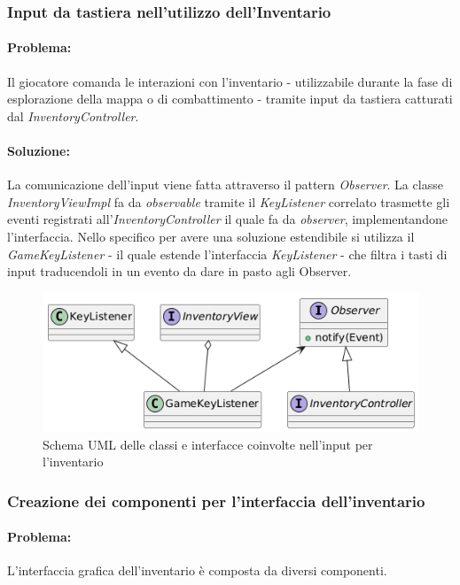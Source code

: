 \documentclass[a4paper,12pt]{report}
\begin{document}
\subsubsection{Input da tastiera nell'utilizzo dell'Inventario}
\paragraph{Problema:} Il giocatore comanda le interazioni con l'inventario - utilizzabile durante la fase di esplorazione della mappa o di combattimento - tramite input da tastiera
catturati dal \textit{InventoryController}.
\paragraph{Soluzione:} La comunicazione dell'input viene fatta attraverso il pattern \textit{Observer}. La classe \textit{InventoryViewImpl} fa da \textit{observable} tramite il 
\textit{KeyListener} correlato trasmette gli eventi registrati all'\textit{InventoryController} il quale fa da \textit{observer}, implementandone l'interfaccia.
Nello specifico per avere una soluzione estendibile si utilizza il \textit{GameKeyListener} - il quale estende l'interfaccia \textit{KeyListener} - che filtra i tasti di input 
traducendoli in un evento da dare in pasto agli Observer. 
\begin{figure}[H]
	\centering{}
	\includegraphics[width=\textwidth]{img/lorenzo/observer-inventory.png}
	\caption{Schema UML delle classi e interfacce coinvolte nell'input per l'inventario}
	\label{img:template}
\end{figure}

\subsubsection{Creazione dei componenti per l'interfaccia dell'inventario}
\paragraph{Problema:} L'interfaccia grafica dell'inventario è composta da diversi componenti.
\end{document}
